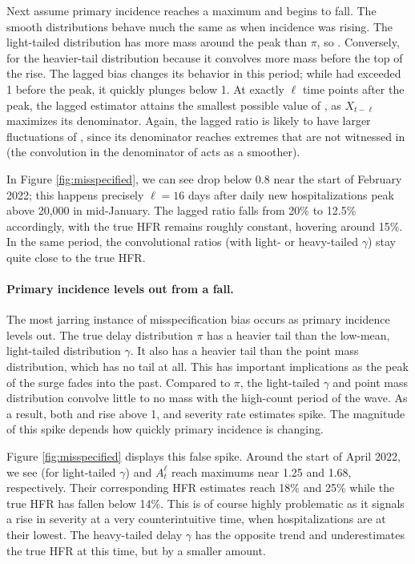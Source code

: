\documentclass{article}
\begin{document}
Next assume primary incidence reaches a maximum and begins to fall. The smooth
distributions behave much the same as when incidence was rising. The light-tailed
distribution has more mass around the peak than $\pi$, so . Conversely,  for the heavier-tail distribution
because it convolves more mass before the top of the rise. The lagged bias
changes its behavior in this period; while  had exceeded 1
before the peak, it quickly plunges below 1. At exactly $\ell$ time points after  
the peak, the lagged estimator attains the smallest possible value of
, as $X_{t-\ell}$ maximizes its denominator. Again, the
lagged ratio is likely to have larger fluctuations of ,
since its denominator reaches extremes that are not witnessed in
 (the convolution in the denominator of 
 acts as a smoother).   

In Figure \ref{fig:misspecified}, we can see  drop below 0.8
near the start of February 2022; this happens precisely $\ell=16$ days after
daily new hospitalizations peak above 20,000 in mid-January. The lagged 
ratio falls from 20\% to 12.5\% accordingly, with the true HFR remains roughly
constant, hovering around 15\%. In the same period, the convolutional ratios
(with light- or heavy-tailed $\gamma$) stay quite close to the true HFR.   

\paragraph{Primary incidence levels out from a fall.}

The most jarring instance of misspecification bias occurs as primary incidence
levels out. The true delay distribution $\pi$ has a heavier tail than the
low-mean, light-tailed distribution $\gamma$. It also has a heavier tail than
the point mass distribution, which has no tail at all. This has important
implications as the peak of the surge fades into the past. Compared to $\pi$,
the light-tailed $\gamma$ and point mass distribution convolve little to no mass
with the high-count period of the wave. As a result, both   
and  rise above 1, and severity rate estimates spike. The
magnitude of this spike depends how quickly primary incidence is changing. 

Figure \ref{fig:misspecified} displays this false spike. Around the start of April 2022,
we see  (for light-tailed $\gamma$) and $A_t^\ell$ reach 
maximums near 1.25 and 1.68, respectively. Their corresponding HFR estimates reach
18\% and 25\% while the true HFR has fallen below 14\%. This is of course highly 
problematic as it signals a rise in severity at a very counterintuitive time,
when hospitalizations are at their lowest. The heavy-tailed delay $\gamma$ has
the opposite trend and underestimates the true HFR at this time, but by a
smaller amount. 
\end{document}
